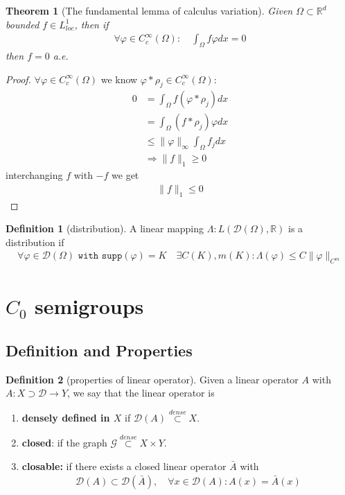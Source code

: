 \documentclass[a4paper,11pt,fleqn]{book}
\newtheorem{theorem}{Theorem}[section]
\theoremstyle{definition}
\newtheorem{definition}{Definition}[section]
\theoremstyle{remark}
\begin{document}
\begin{theorem}[The fundamental lemma of calculus variation]
	Given $\Omega \subset \mathbb{R}^d$  bounded $f \in L^1_{loc}$, then if 
	\begin{align*}
		\forall \varphi \in C_c^\infty(\Omega): \quad 
		\int_\Omega f \varphi dx = 0
	\end{align*}
	then $f = 0$ a.e. 
\end{theorem}
\begin{proof}
	$\forall \varphi \in C_c^\infty(\Omega)$ we know $\varphi * \rho_j \in C_c^\infty(\Omega)$:
	\begin{align*}
		 0 &= \int_\Omega f (\varphi *\rho_j) dx \\
		 &= \int_\Omega (f * \rho_j) \varphi dx \\
		 &\le \|\varphi\|_\infty \int_\Omega f_j dx \\
		 &\Rightarrow 
		 \|f\|_1 \geq 0
	\end{align*}
	interchanging $f$ with $-f$ we get
	\begin{align*}
		\|f\|_1 \le 0
	\end{align*}
\end{proof}

\begin{definition}[distribution]
	A linear mapping $\Lambda: L( \mathcal{D}(\Omega), \mathbb{R})$ is a distribution if
	\begin{align*}
		\forall \varphi \in \mathcal{D}(\Omega) \texttt{ with } \texttt{supp}(\varphi) = K \quad \exists C(K), m(K):  \Lambda(\varphi) \le C\|\varphi\|_{C^m} 
	\end{align*}
\end{definition}



\section{\texorpdfstring{$C_0$}{C\_0} semigroups}
\subsection{Definition and Properties}
\begin{definition}[properties of linear operator]
	Given a linear operator $A$ with $A: X \supset \mathcal{D} \rightarrow Y$, we say that the linear operator is 
	\begin{enumerate}
		\item \textbf{densely defined in $X$} if $\mathcal{D}(A) \overset{dense}{\subset} X$.
		\item \textbf{closed}: if the graph $\mathcal{G} \overset{dense}{\subset} X \times Y$. 
		\item \textbf{closable:} if there exists a closed linear operator $\bar{A}$ with 
		\begin{align*}
			\mathcal{D}(A) \subset \mathcal{D}(\bar{A}), \quad \forall x \in \mathcal{D}(A): A(x) = \bar{A}(x)
		\end{align*}
	\end{enumerate}
\end{definition}
\end{document}
